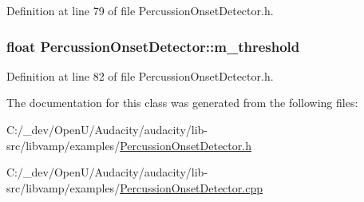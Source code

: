 Definition at line 79 of file Percussion\+Onset\+Detector.\+h.

\subsubsection[{\texorpdfstring{m\+\_\+threshold}{m_threshold}}]{\setlength{\rightskip}{0pt plus 5cm}float Percussion\+Onset\+Detector\+::m\+\_\+threshold\hspace{0.3cm}{\ttfamily [protected]}}\hypertarget{class_percussion_onset_detector_ab04119adad56d87f2e633de289aab507}{}\label{class_percussion_onset_detector_ab04119adad56d87f2e633de289aab507}


Definition at line 82 of file Percussion\+Onset\+Detector.\+h.



The documentation for this class was generated from the following files\+:\begin{DoxyCompactItemize}
\item 
C\+:/\+\_\+dev/\+Open\+U/\+Audacity/audacity/lib-\/src/libvamp/examples/\hyperlink{_percussion_onset_detector_8h}{Percussion\+Onset\+Detector.\+h}\item 
C\+:/\+\_\+dev/\+Open\+U/\+Audacity/audacity/lib-\/src/libvamp/examples/\hyperlink{_percussion_onset_detector_8cpp}{Percussion\+Onset\+Detector.\+cpp}\end{DoxyCompactItemize}
